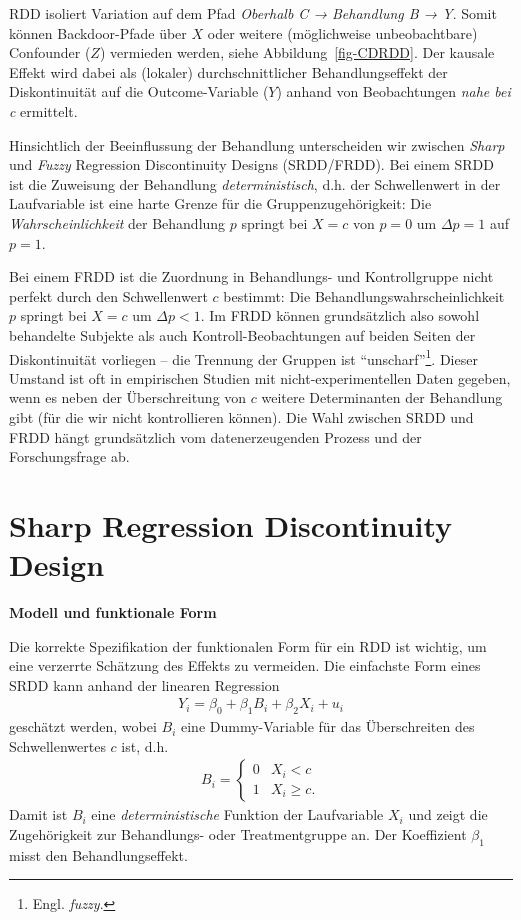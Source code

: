 \documentclass[
  a4paper,
  DIV=11,
  oneside]{scrreprt}
\begin{document}
RDD isoliert Variation auf dem Pfad \emph{Oberhalb C → Behandlung B →
Y}. Somit können Backdoor-Pfade über \(X\) oder weitere (möglichweise
unbeobachtbare) Confounder (\(Z\)) vermieden werden, siehe
Abbildung~\ref{fig-CDRDD}. Der kausale Effekt wird dabei als (lokaler)
durchschnittlicher Behandlungseffekt der Diskontinuität auf die
Outcome-Variable (\(Y\)) anhand von Beobachtungen \emph{nahe bei c}
ermittelt.

Hinsichtlich der Beeinflussung der Behandlung unterscheiden wir zwischen
\emph{Sharp} und \emph{Fuzzy} Regression Discontinuity Designs
(SRDD/FRDD). Bei einem SRDD ist die Zuweisung der Behandlung
\emph{deterministisch}, d.h. der Schwellenwert in der Laufvariable ist
eine harte Grenze für die Gruppenzugehörigkeit: Die
\emph{Wahrscheinlichkeit} der Behandlung \(p\) springt bei \(X=c\) von
\(p=0\) um \(\Delta p = 1\) auf \(p=1\).

Bei einem FRDD ist die Zuordnung in Behandlungs- und Kontrollgruppe
nicht perfekt durch den Schwellenwert \(c\) bestimmt: Die
Behandlungswahrscheinlichkeit \(p\) springt bei \(X=c\) um
\(\Delta p<1\). Im FRDD können grundsätzlich also sowohl behandelte
Subjekte als auch Kontroll-Beobachtungen auf beiden Seiten der
Diskontinuität vorliegen -- die Trennung der Gruppen ist
``unscharf''\footnote{Engl. \emph{fuzzy}.}. Dieser Umstand ist oft in
empirischen Studien mit nicht-experimentellen Daten gegeben, wenn es
neben der Überschreitung von \(c\) weitere Determinanten der Behandlung
gibt (für die wir nicht kontrollieren können). Die Wahl zwischen SRDD
und FRDD hängt grundsätzlich vom datenerzeugenden Prozess und der
Forschungsfrage ab.

\section{Sharp Regression Discontinuity
Design}\label{sharp-regression-discontinuity-design}

\textbf{Modell und funktionale Form}

Die korrekte Spezifikation der funktionalen Form für ein RDD ist
wichtig, um eine verzerrte Schätzung des Effekts zu vermeiden. Die
einfachste Form eines SRDD kann anhand der linearen Regression
\begin{align}
Y_i = \beta_0 + \beta_1 B_i + \beta_2 X_i + u_i\label{eq-simpleSRDD}
\end{align} geschätzt werden, wobei \(B_i\) eine Dummy-Variable für das
Überschreiten des Schwellenwertes \(c\) ist, d.h. \begin{align*}
  B_i=\begin{cases}
    0 & X_i < c\\
    1 & X_i \geq c.
  \end{cases}
\end{align*} Damit ist \(B_i\) eine \emph{deterministische} Funktion der
Laufvariable \(X_i\) und zeigt die Zugehörigkeit zur Behandlungs- oder
Treatmentgruppe an. Der Koeffizient \(\beta_1\) misst den
Behandlungseffekt.
\end{document}
